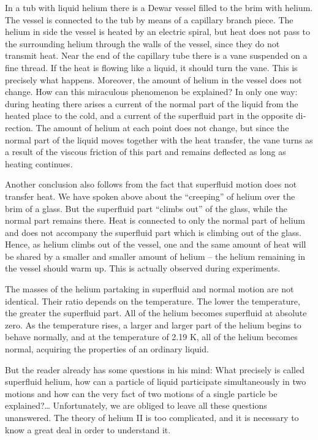 In a tub with liquid helium there is a Dewar vessel filled to the brim with helium. The vessel is connected to the tub by means of a capillary branch piece. The helium in­ side the vessel is heated by an electric spiral, but heat does not pass to the surrounding helium through the walls of the vessel, since they do not transmit heat. Near the end of the capillary tube there is a vane suspended on a fine thread. If the heat is flowing like a liquid, it should turn the vane. This is precisely what happens. Moreover, the amount of helium in the vessel does not change. How can this miraculous phenomenon be explained? In only one way: during heating there arises a current of the nor­mal part of the liquid from the heated place to the cold, and a current of the superfluid part in the opposite di­rection. The amount of helium at each point does not change, but since the normal part of the liquid moves together with the heat transfer, the vane turns as a re­sult of the viscous friction of this part and remains de­flected as long as heating continues.

Another conclusion also follows from the fact that su­perfluid motion does not transfer heat. We have spoken above about the ``creeping'' of helium over the brim of a glass. But the superfluid part ``climbs out'' of the glass, while the normal part remains there. Heat is connected to only the normal part of helium and does not accompany the superfluid part which is climbing out of the glass. Hence, as helium climbs out of the vessel, one and the same amount of heat will be shared by a smaller and smaller amount of helium -- the helium remaining in the vessel should warm up. This is actually observed during experiments.

The masses of the helium partaking in superfluid and normal motion are not identical. Their ratio depends on the temperature. The lower the temperature, the greater the superfluid part. All of the helium becomes superfluid at absolute zero. As the temperature rises, a larger and larger part of the helium begins to behave normally, and at the temperature of 2.19 K, all of the helium becomes normal, acquiring the properties of an ordinary liquid.

But the reader already has some questions in his mind: What precisely is called superfluid helium, how can a particle of liquid participate simultaneously in two mo­tions and how can the very fact of two motions of a single particle be explained?\ldots{} Unfortunately, we are obliged to leave all these questions unanswered. The theory of helium II is too complicated, and it is necessary to know a great deal in order to understand it.

